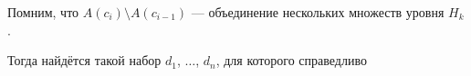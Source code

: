 Помним, что $A\left( c_{i} \right) \setminus A\left( c_{i-1} \right)$ ---
объединение нескольких множеств уровня $H_k$.
\begin{comment}
Для любого $t$ разность множеств
$A\left( c_{t} \right) \setminus A\left( c_{t-1} \right) \neq \emptyset$
(когда это множество пустое, то индикатор просто не сработает и нечего считать)
можно представить как объединение двух непересекающихся множеств,
которые обозначим $H_1^t \in \mathfrak{F}$ и $H_2^t \in \mathfrak{F}$,
причём $H_1^t$ --- множество уровня, а $H_2^t$ --- произвольное множество
из $\mathfrak{F}$ (в том числе и пустое, если разность и есть множество уровня).
Тогда $t$-ое слагаемое примет следующий вид
$$c_t \cdot \Indicator{\omega \in
  A\left( c_{t} \right) \setminus A\left( c_{t-1} \right)}
  = c_t \cdot \Indicator{\omega \in H_1^t \cup H_2^t}$$

Поскольку множества $H_1^t$ и $H_2^t$ по условию не пересекаются,
то можно разбить индикатор на сумму
\begin{align*}
c_t \cdot \Indicator{\omega \in H_1^t \cup H_2^t}
  &= c_t \cdot \left( \Indicator{\omega \in H_1^t}
      + \Indicator{\omega \in H_2^t} \right) \\
  &= c_t \cdot \Indicator{\omega \in H_1^t}
      + c_t \cdot \Indicator{\omega \in H_2^t}
\end{align*}

Если ввести две константы $c_1^t$ и $c_2^t$, которые будут равны старой $c_t$,
то равенство примет более симпатичный вид
$$c_t \cdot \Indicator{\omega \in H_1^t}
  + c_t \cdot \Indicator{\omega \in H_2^t}
  = c_1^t \cdot \Indicator{\omega \in H_1^t}
  + c_2^t \cdot \Indicator{\omega \in H_2^t}$$

Если же $H_2^t$ не является пустым множеством $\emptyset$
или множеством уровня $H_k$, то нужно повторить процедуру,
разбив $H_2^t$ на объединение двух непересекающихся множеств --- на множество
уровня и множество из $\mathfrak{F}$.
В итоге (вследствие конечности множества $\mathfrak{F}$)
индикатор разности $A\left( c_{t} \right) \setminus A\left( c_{t-1} \right)$
будет разбита на сумму индикаторов множеств уровней.

Таким же образом можно поступить со всеми остальными индикаторами.
В итоге получим $n$ констант $d_1, d_2, \dots, d_n$
вместо $m$ чисел $c_1, c_2, \dots, c_m$.

Теперь сумма примет более приятный для глаз
и понятный из контекста начала раздела вид
\end{comment}
Тогда найдётся такой набор $d_1$, $\dots$, $d_n$, для которого справедливо
